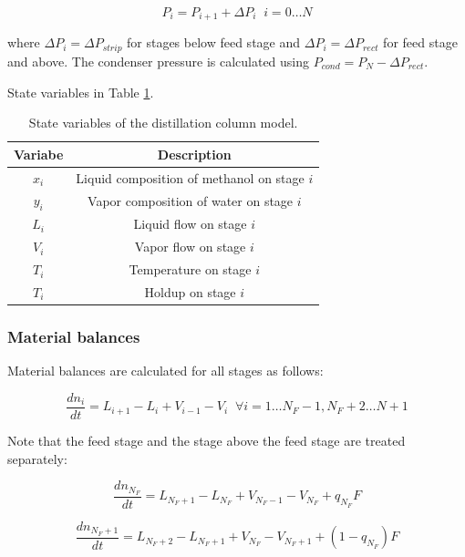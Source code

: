 \begin{equation}
    P_i = P_{i+1} + \Delta P_i \;\; i=0\dots N
\end{equation}

where $\Delta P_i =\Delta P_{strip}$ for stages below feed stage and $\Delta P_i =\Delta P_{rect}$ for feed stage and above. The condenser pressure is calculated using $P_{cond}=P_{N} - \Delta P_{rect}$.

State variables in Table \ref{tab:state_variables}.
\begin{table}
    \centering
    \caption{State variables of the distillation column model.}
    \begin{tabular}{cc}
        \textbf{Variabe} & \textbf{Description}  \\
        \hline
         $x_i$ &  Liquid composition of methanol on stage $i$ \\
         $y_i$ & Vapor composition of water on stage $i$\\
         $L_i$ & Liquid flow on stage $i$  \\
         $V_i$  & Vapor flow on stage $i$ \\
         $T_i$  & Temperature on stage $i$ \\
         $T_i$  & Holdup on stage $i$ \\
         \hline
    \end{tabular}
    \label{tab:state_variables}
\end{table}

\subsubsection{Material balances}
Material balances are calculated for all stages as follows:

\begin{equation}
\frac{dn_i}{dt} = L_{i+1}-L_i + V_{i-1}-V_i \;\; \forall i=1 \dots N_F-1, N_F+2 \dots N+1
\end{equation}

Note that the feed stage and the stage above the feed stage are treated separately:

\begin{equation}
    \frac{dn_{N_F}}{dt} = L_{N_F+1}-L_{N_F} + V_{N_F-1}-V_{N_F} + q_{N_F}F   
\end{equation}

\begin{equation}
   \frac{dn_{N_F+1}}{dt} = L_{N_F+2}-L_{N_F+1} + V_{N_F}-V_{N_F+1} + (1-q_{N_F})F 
\end{equation}


